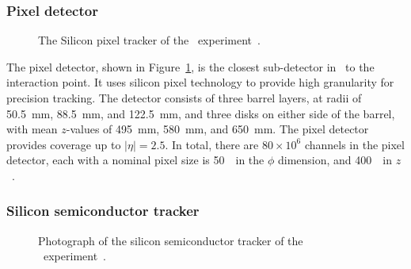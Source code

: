 \subsubsection{Pixel detector} 
\label{sec:pixel}

\begin{figure}[ht]
  \caption{
    The Silicon pixel tracker of the \atlas\ experiment~\cite{Pequenao:1095925}.
  }
  \label{fig:pixel_cartoon}
\end{figure}

The pixel detector, shown in Figure~\ref{fig:pixel_cartoon}, is the closest
sub-detector in \atlas\ to the interaction point.
It uses silicon pixel technology to provide high granularity for precision
tracking.
The detector consists of three barrel layers, at radii of 50.5~mm, 88.5~mm,
and 122.5~mm, and three disks on either side of the barrel, with mean $z$-values
of 495~mm, 580~mm, and 650~mm.
The pixel detector provides coverage up to $|\eta| = 2.5$.
In total, there are $80 \times 10^{6}$ channels in the pixel detector, each 
with a nominal pixel size is 50~\um\ in the $\phi$ dimension, and 400~\um\ in
$z$~\cite{1748-0221-3-07-P07007}.

\FloatBarrier
\subsubsection{Silicon semiconductor tracker} 
\label{sec:sct}

\begin{figure}[ht]
  \caption{
    Photograph of the silicon semiconductor tracker of the
    \atlas\ experiment~\cite{Maximilien:883305}.
  }
  \label{fig:sct_photo}
\end{figure}


